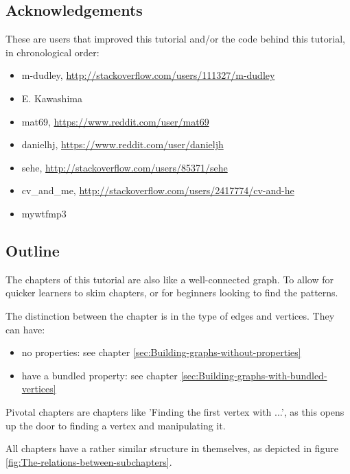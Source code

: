 \subsection{Acknowledgements}


These are users that improved this tutorial and/or the code behind this
tutorial, in chronological order:

\begin{itemize}
  \item m-dudley, \url{http://stackoverflow.com/users/111327/m-dudley}
  \item E. Kawashima
  \item mat69, \url{https://www.reddit.com/user/mat69}
  \item danielhj, \url{https://www.reddit.com/user/danieljh}
  \item sehe, \url{http://stackoverflow.com/users/85371/sehe}
  \item cv\_and\_me, \url{http://stackoverflow.com/users/2417774/cv-and-he}
  \item mywtfmp3
\end{itemize}

\subsection{Outline}

The chapters of this tutorial are also like a well-connected graph.
To allow for quicker learners to skim chapters, or for beginners looking
to find the patterns.

The distinction between the chapter is in the type of edges and vertices.
They can have:

\begin{itemize}
  \item no properties: 
    see chapter \ref{sec:Building-graphs-without-properties}
  \item have a bundled property: 
    see chapter \ref{sec:Building-graphs-with-bundled-vertices}
\end{itemize}

Pivotal chapters are chapters like 'Finding the first vertex with ...', as
this opens up the door to finding a vertex and manipulating it.

All chapters have a rather similar structure in themselves, as depicted
in figure \ref{fig:The-relations-between-subchapters}.

